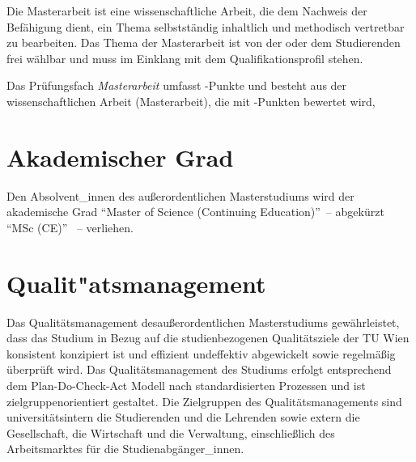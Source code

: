 \newcommand*\PFDA{%
  \ifDASEMINAR{%
    \LV{1,5}{1,0}{SE}{Wissenschaftliches Arbeiten}[WissenschaftlichesArbeiten]\\
  }{}%
  \hspace*{0.9mm} \ECTS{27,0} \hspace*{-0.4mm} Masterarbeit \\
    \ifDASEMINAR{%
      \hspace*{0.9mm} \ECTS{1,5} \hspace*{1.6mm} Kommissionelle Abschlussprüfung%
  }{
  \hspace*{0.9mm} \ECTS{3,0} \hspace*{1.6mm} Kommissionelle Abschlussprüfung%
  }%
}
\let\PFDASem\PFDA %

Die Masterarbeit ist eine wissenschaftliche Arbeit, die 
dem Nachweis der Befähigung dient, ein Thema selbstständig
inhaltlich und methodisch vertretbar zu bearbeiten. Das Thema der
Masterarbeit ist von der oder dem Studierenden frei wählbar und muss
im Einklang mit dem Qualifikationsprofil stehen.

Das Prüfungsfach \emph{Masterarbeit} umfasst -Punkte
und besteht aus der wissenschaftlichen Arbeit (Masterarbeit),
die mit -Punkten bewertet wird,
%

\section{Akademischer Grad}\label{sec:AG}

Den Absolvent\_innen des außerordentlichen Masterstudiums 
\emph{} wird der akademische Grad
"`Master of Science (Continuing Education)"'~-- abgekürzt 
"`MSc (CE)"' ~-- verliehen.

\section{Qualit"atsmanagement}\label{sec:IQ}

Das Qualitätsmanagement desaußerordentlichen Masterstudiums 
\emph{} gewährleistet, dass das Studium in Bezug auf 
die studienbezogenen Qualitätsziele der TU Wien konsistent konzipiert 
ist und effizient undeffektiv abgewickelt sowie regelmäßig überprüft wird. 
Das Qualitätsmanagement des Studiums erfolgt entsprechend dem
Plan-Do-Check-Act Modell nach standardisierten Prozessen und ist
zielgruppenorientiert gestaltet. Die Zielgruppen des
Qualitätsmanagements sind universitätsintern die Studierenden und die
Lehrenden sowie extern die Gesellschaft, die Wirtschaft und die
Verwaltung, einschließlich des Arbeitsmarktes für die
Studienabgänger\_innen. 
\medskip

